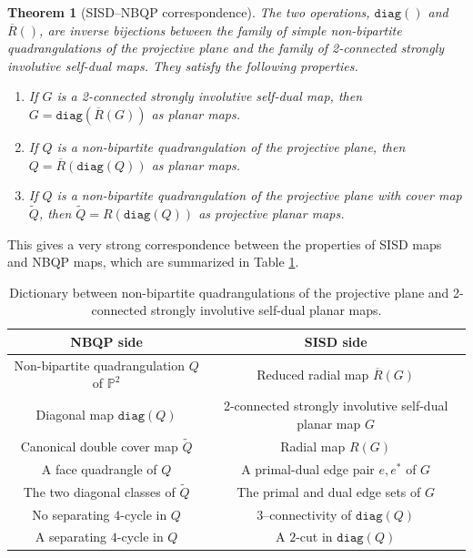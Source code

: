 \documentclass{article}
\renewcommand{\arraystretch}{1.5}
\newtheorem{theorem}{Theorem}[section]
\newcommand{\Pb}[0]{\mathbb{P}}
\newcommand{\diag}[0]{\mathtt{diag}}
\begin{document}
\begin{theorem}[SISD--NBQP correspondence]\label{thm:commute} The two operations, $\diag()$ and $\overline R()$, are inverse bijections between the family of simple non-bipartite quadrangulations of the projective plane  and the family of 2-connected strongly involutive self-dual maps. They satisfy the following properties.  
\begin{enumerate}
    \item[a)] If $G$ is a 2-connected strongly involutive self-dual map, then $G=\diag(\overline R(G))$ as planar maps.
    \item[b)] If $Q$ is a non-bipartite quadrangulation of the projective plane, then $Q=\overline R(\diag(Q))$ as planar maps.
    \item[c)] If $Q$ is a non-bipartite quadrangulation of the projective plane with cover map $\widetilde Q$, then $\widetilde Q= R(\diag(Q))$ as projective planar maps.

\end{enumerate}
    \end{theorem}


This gives a very strong correspondence between the properties of SISD maps and NBQP maps, which are summarized in Table \ref{tab:nbqp-sisd-dictionary}.


 \begin{table}[ht]
\centering
\renewcommand{\arraystretch}{1.25}
\begin{tabular}{c|c}
\textbf{NBQP side} & \textbf{SISD side} \\
\hline
Non-bipartite quadrangulation $Q$ of $\Pb^2$
&
Reduced radial map $\overline R(G)$
\\
Diagonal map  $\diag(Q)$
&
2-connected strongly involutive self-dual planar map $G$
\\

Canonical double cover map $\widetilde Q$
&
Radial map $R(G)$
\\

A face quadrangle of $Q$
&
A primal-dual edge pair $e,e^*$ of $G$
\\

The two diagonal classes of $\widetilde Q$
&
The primal and dual edge sets of $G$
\\

No separating $4$-cycle in $Q$
&
3--connectivity of $\diag(Q)$
\\

A separating $4$-cycle in $Q$
&
A $2$-cut in $\diag(Q)$
\\

\end{tabular}
\caption{Dictionary between non-bipartite quadrangulations of the projective plane and 2-connected strongly involutive self-dual planar maps.}
\label{tab:nbqp-sisd-dictionary}
\end{table}
 
\end{document}
